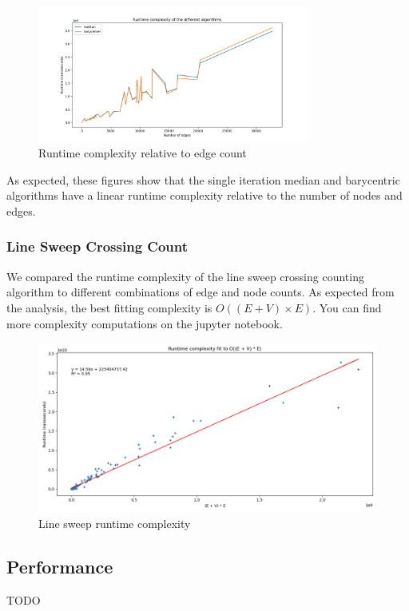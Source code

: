 \documentclass[a4paper]{article}
\begin{document}
\begin{figure}[ht]
	\centering
	\includegraphics[width=0.8\textwidth]{images/edge_runtime_complexity.png}
	\caption{Runtime complexity relative to edge count}
\end{figure}

As expected, these figures show that the single iteration median and barycentric algorithms have a linear runtime complexity relative to the number of nodes and edges.\\

\subsubsection*{Line Sweep Crossing Count}
We compared the runtime complexity of the line sweep crossing counting algorithm to different combinations of edge and node counts.
As expected from the analysis, the best fitting complexity is $O((E + V) \times E)$. You can find more complexity computations on the jupyter notebook.\\


\begin{figure}[ht]
	\centering
	\includegraphics[width=1\textwidth]{images/runtime_crossing.png}
	\caption{Line sweep runtime complexity}
\end{figure}


\subsection{Performance}

TODO

\eject



\end{document}
